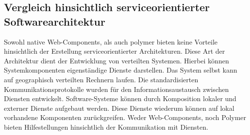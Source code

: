 \subsection{Vergleich hinsichtlich serviceorientierter Softwarearchitektur}
\label{sec:5_Vergleich_SOA}

Sowohl native Web-Components, als auch polymer bieten keine Vorteile hinsichtlich der Erstellung serviceorientierter Architekturen. Diese Art der Architektur dient der Entwicklung von verteilten Systemen. Hierbei können Systemkomponenten eigenständige Dienste darstellen. Das System selbst kann auf geographisch verteilten Rechnern laufen. Die standardisierten Kommunikationsprotokolle wurden für den Informationsaustausch zwischen Diensten entwickelt. Software-Systeme können durch Komposition lokaler und externer Dienste aufgebaut werden. Diese Dienste wiederum können auf lokal vorhandene Komponenten zurückgreifen. Weder Web-Components, noch Polymer bieten Hilfestellungen hinsichtlich der Kommunikation mit Diensten.

